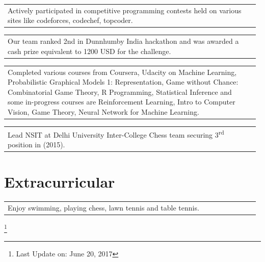 \documentclass[a4paper]{article} %
\newcommand{\verticalspacing}{-0.25cm}
\newcommand{\bulletspace}{0.7cm}
\newcommand{\projectheadspacing}{6.9cm}
\newcommand{\skill}[2]{%
    \begin{tabular}{p{0.60\linewidth}r}
        \small {#2} & \multicolumn{1}{m{ \projectheadspacing{} }}{\raggedleft \textsc{\small #1}}\\
    \end{tabular}
    \vspace{\verticalspacing{}}
}
\newcommand{\lineskill}[2]{%
    \begin{tabular}{p{0.98\linewidth}r}
        \small {#2} & \multicolumn{1}{m{ \projectheadspacing{} }}{\raggedleft \textsc{\small #1}}\\
    \end{tabular}
    \vspace{\verticalspacing{}}
    \vspace{-0.0cm} %
}
\begin{document}

\lineskill
	{}
    {Actively participated in competitive programming contests held on various sites like codeforces, codechef, topcoder.}

\lineskill
	{}
	{Our team ranked 2nd in Dunnhumby India hackathon and was awarded a cash prize equivalent to 1200 USD for the challenge.}

\lineskill
	{}
	{Completed various courses from Coursera, Udacity on Machine Learning, Probabilistic Graphical Models 1: Representation, Game without Chance: Combinatorial Game Theory, R Programming, Statistical Inference and some in-progress courses are Reinforcement Learning, Intro to Computer Vision, Game Theory, Neural Network for Machine Learning.}
	
\lineskill %
	{}
	{Lead NSIT at Delhi University Inter-College Chess team securing 3\textsuperscript{rd} position in (2015).}



\section{Extracurricular}

\lineskill
    {}
    {Enjoy swimming, playing chess, lawn tennis and table tennis.}

\vspace{-0.65cm}
\let\thefootnote\relax\footnote{Last Update on: June 20, 2017}
\end{document}
